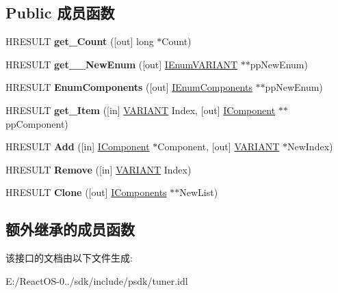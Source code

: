 \subsection*{Public 成员函数}
\begin{DoxyCompactItemize}
\item 
\mbox{\label{interface_i_components_old_ac15664643e0afeab6cafae01e88448ae}} 
H\+R\+E\+S\+U\+LT {\bfseries get\+\_\+\+Count} (\mbox{[}out\mbox{]} long $\ast$Count)
\item 
\mbox{\label{interface_i_components_old_ab2912568325c3403d2444d605ae6c1ea}} 
H\+R\+E\+S\+U\+LT {\bfseries get\+\_\+\+\_\+\+New\+Enum} (\mbox{[}out\mbox{]} \hyperlink{interface_i_enum_v_a_r_i_a_n_t}{I\+Enum\+V\+A\+R\+I\+A\+NT} $\ast$$\ast$pp\+New\+Enum)
\item 
\mbox{\label{interface_i_components_old_a51037a82c042d2e83811d47f30d9bf7b}} 
H\+R\+E\+S\+U\+LT {\bfseries Enum\+Components} (\mbox{[}out\mbox{]} \hyperlink{interface_i_enum_components}{I\+Enum\+Components} $\ast$$\ast$pp\+New\+Enum)
\item 
\mbox{\label{interface_i_components_old_a20d36f61b7e714c92e935f87f03596e1}} 
H\+R\+E\+S\+U\+LT {\bfseries get\+\_\+\+Item} (\mbox{[}in\mbox{]} \hyperlink{structtag_v_a_r_i_a_n_t}{V\+A\+R\+I\+A\+NT} Index, \mbox{[}out\mbox{]} \hyperlink{interface_i_component}{I\+Component} $\ast$$\ast$pp\+Component)
\item 
\mbox{\label{interface_i_components_old_a61224c91aa83dff57f092c70aed03d64}} 
H\+R\+E\+S\+U\+LT {\bfseries Add} (\mbox{[}in\mbox{]} \hyperlink{interface_i_component}{I\+Component} $\ast$Component, \mbox{[}out\mbox{]} \hyperlink{structtag_v_a_r_i_a_n_t}{V\+A\+R\+I\+A\+NT} $\ast$New\+Index)
\item 
\mbox{\label{interface_i_components_old_a9b3e6cba38f88e605af48993828095fd}} 
H\+R\+E\+S\+U\+LT {\bfseries Remove} (\mbox{[}in\mbox{]} \hyperlink{structtag_v_a_r_i_a_n_t}{V\+A\+R\+I\+A\+NT} Index)
\item 
\mbox{\label{interface_i_components_old_afdf52d7d7e3c9060a326388914ff2ed4}} 
H\+R\+E\+S\+U\+LT {\bfseries Clone} (\mbox{[}out\mbox{]} \hyperlink{interface_i_components}{I\+Components} $\ast$$\ast$New\+List)
\end{DoxyCompactItemize}
\subsection*{额外继承的成员函数}


该接口的文档由以下文件生成\+:\begin{DoxyCompactItemize}
\item 
E\+:/\+React\+O\+S-\/0../sdk/include/psdk/tuner.\+idl\end{DoxyCompactItemize}
